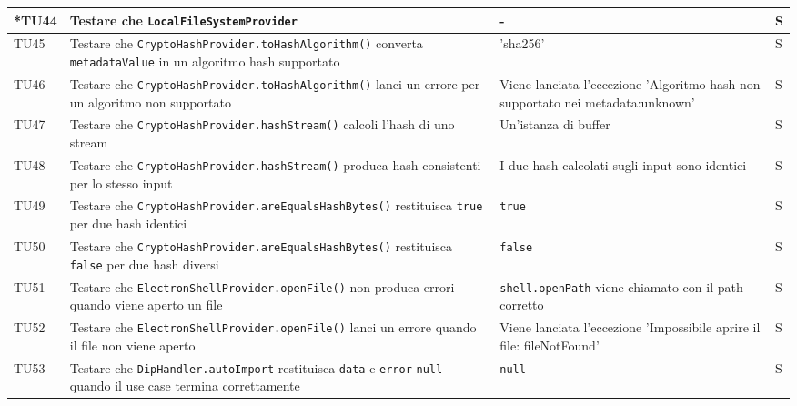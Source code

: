 \documentclass[a4paper,12pt]{article}
\begin{document}
\begin{longtable}{|M{1.2cm}|M{5cm}|M{7cm}|M{1.5cm}|}
            *TU44 & Testare che \texttt{LocalFileSystemProvider} & - & S \\
            \hline

            TU45 & Testare che \texttt{CryptoHashProvider.toHashAlgorithm()} converta \texttt{metadataValue} in un algoritmo hash supportato & 'sha256' & S \\
            \hline

            TU46 & Testare che \texttt{CryptoHashProvider.toHashAlgorithm()} lanci un errore per un algoritmo non supportato & Viene lanciata l'eccezione 'Algoritmo hash non supportato nei metadata:unknown' & S \\
            \hline

            TU47 & Testare che \texttt{CryptoHashProvider.hashStream()} calcoli l'hash di uno stream & Un'istanza di buffer & S \\
            \hline

            TU48 & Testare che \texttt{CryptoHashProvider.hashStream()} produca hash consistenti per lo stesso input & I due hash calcolati sugli input sono identici & S \\
            \hline
            
            TU49 & Testare che \texttt{CryptoHashProvider.areEqualsHashBytes()} restituisca \texttt{true} per due hash identici & \texttt{true} & S \\
            \hline
          
            TU50 & Testare che \texttt{CryptoHashProvider.areEqualsHashBytes()} restituisca \texttt{false} per due hash diversi & \texttt{false} & S \\
            \hline

            TU51 & Testare che \texttt{ElectronShellProvider.openFile()} non produca errori quando viene aperto un file & \texttt{shell.openPath} viene chiamato con il path corretto & S \\
            \hline

            TU52 & Testare che \texttt{ElectronShellProvider.openFile()} lanci un errore quando il file non viene aperto & Viene lanciata l'eccezione 'Impossibile aprire il file: fileNotFound' & S \\
            \hline


            TU53 & Testare che \texttt{DipHandler.autoImport} restituisca \texttt{data} e \texttt{error} \texttt{null} quando il use case termina correttamente & \texttt{null} & S \\
            \hline


\end{longtable}
\end{document}
